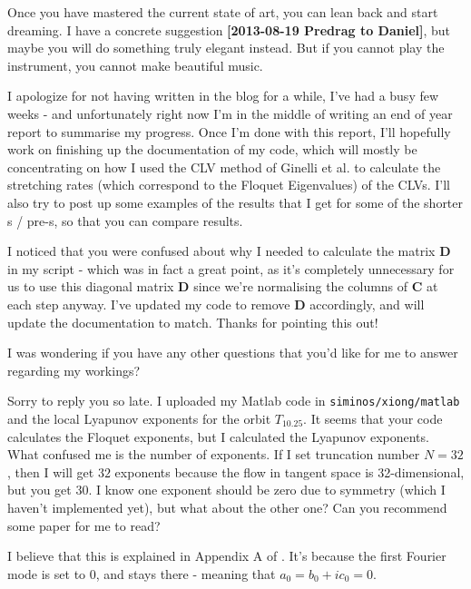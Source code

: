 \begin{description}
Once you have mastered the current state of art, you can lean back and start dreaming. I have a concrete suggestion {\bf [2013-08-19 Predrag to Daniel]}, but maybe you will do something truly elegant instead. But if you cannot play the instrument, you cannot make beautiful music.


\item[2013-09-29 Daniel to Xiong]
I apologize for not having written in the blog for a while, I've had a
busy few weeks - and unfortunately right now I'm in the middle of writing
an end of year report to summarise my progress. Once I'm done with this
report, I'll hopefully work on finishing up the documentation of my code,
which will mostly be concentrating on how I used the CLV method of
Ginelli et al. to calculate the stretching rates (which correspond to the
Floquet Eigenvalues) of the CLVs. I'll also try to post up some examples
of the results that I get for some of the shorter \rpo s / pre-\po s, so that you
can compare results.

I noticed that you were confused about why I needed to calculate the matrix \textbf{D} in my script - which was in fact a great point, as it's completely unnecessary for us to use this diagonal matrix \textbf{D} since we're normalising the columns of \textbf{C} at each step anyway. I've updated my code to remove \textbf{D} accordingly, and will update the documentation to match. Thanks for pointing this out!

I was wondering if you have any other questions that you'd like for me to answer regarding my workings?

\item[2013-10-05 Xiong to Daniel]
Sorry to reply you so late. I uploaded my Matlab code in
\texttt{siminos/xiong/matlab} and the local Lyapunov exponents for the
orbit $T_{10.25}$. It seems that your code calculates the Floquet
exponents, but I calculated the Lyapunov exponents. What confused me is
the number of exponents. If I set truncation number $N=32$, then I will
get $32$ exponents because the flow in tangent space is 32-dimensional,
but you get $30$. I know one exponent should be zero due to symmetry
(which I haven't implemented yet), but what about the other one? Can you
recommend some paper for me to read?

\item[2013-10-07 Daniel to Xiong]
I believe that this is explained in Appendix A of . It's because the first Fourier mode is set to 0, and stays there - meaning that $a_0 = b_0 + ic_0 = 0$.


\end{description}
